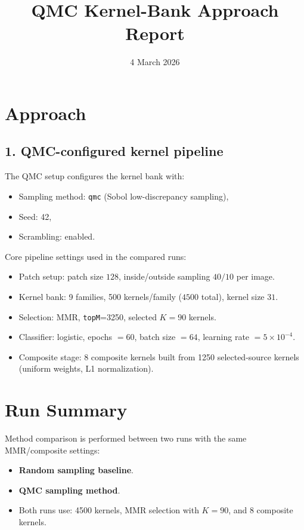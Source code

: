 \documentclass{article}
\begin{document}
\title{QMC Kernel-Bank Approach Report}
\author{}
\date{4 March 2026}
\maketitle

\section*{Approach}
\subsection*{1. QMC-configured kernel pipeline}
The QMC setup configures the kernel bank with:
\begin{itemize}
    \item Sampling method: \texttt{qmc} (Sobol low-discrepancy sampling),
    \item Seed: 42,
    \item Scrambling: enabled.
\end{itemize}

Core pipeline settings used in the compared runs:
\begin{itemize}
    \item Patch setup: patch size $128$, inside/outside sampling $40/10$ per image.
    \item Kernel bank: 9 families, 500 kernels/family ($4500$ total), kernel size $31$.
    \item Selection: MMR, \texttt{topM}=3250, selected \(K=90\) kernels.
    \item Classifier: logistic, epochs $=60$, batch size $=64$, learning rate $=5\times10^{-4}$.
    \item Composite stage: 8 composite kernels built from 1250 selected-source kernels (uniform weights, L1 normalization).
\end{itemize}

\section*{Run Summary}
Method comparison is performed between two runs with the same MMR/composite settings:
\begin{itemize}
    \item \textbf{Random sampling baseline}.
    \item \textbf{QMC sampling method}.
    \item Both runs use: 4500 kernels, MMR selection with \(K=90\), and 8 composite kernels.
\end{itemize}
\end{document}
